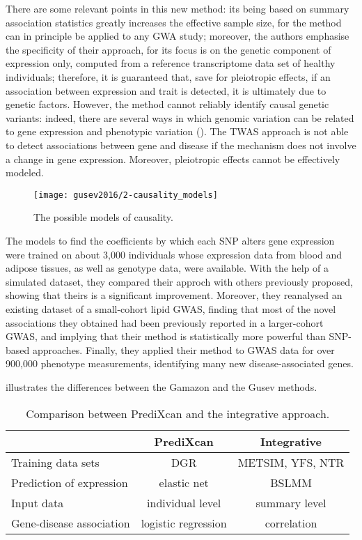 \documentclass[../main.tex]{subfiles}
\begin{document}
There are some relevant points in this new method: its being based on 
summary association statistics greatly increases the effective sample 
size, for the method can in principle be applied to any GWA study; 
moreover, the authors emphasise the specificity of their approach, for 
its focus is on the genetic component of expression only, computed from 
a reference transcriptome data set of healthy individuals; therefore, it 
is guaranteed that, save for pleiotropic effects, if an association 
between expression and trait is detected, it is ultimately due to 
genetic factors. However, the method cannot reliably identify causal 
genetic variants: indeed, there are several ways in which genomic 
variation can be related to gene expression and phenotypic variation 
(). The TWAS approach is not able to detect 
associations between gene and disease if the mechanism does not involve 
a change in gene expression. Moreover, pleiotropic effects cannot be 
effectively modeled.

\begin{figure}
	\texttt{[image: gusev2016/2-causality\_models]}
	\caption{The possible models of causality.}
\end{figure}

The models to find the coefficients by which each SNP alters gene 
expression were trained on about 3,000 individuals whose expression data 
from blood and adipose tissues, as well as genotype data, were 
available. With the help of a simulated dataset, they compared their 
approch with others previously proposed, showing that theirs is a 
significant improvement. Moreover, they reanalysed an existing dataset 
of a small-cohort lipid GWAS, finding that most of the novel 
associations they obtained had been previously reported in a 
larger-cohort GWAS, and implying that their method is statistically more 
powerful than SNP-based approaches. Finally, they applied their method 
to GWAS data for over 900,000 phenotype measurements, identifying many 
new disease-associated genes.

 illustrates the differences between the Gamazon and 
the Gusev methods.

\begin{table}
	\begin{tabular}{ l c c }
		\toprule
		& PrediXcan & Integrative \\
		\midrule
		Training data sets & DGR & METSIM, YFS, NTR \\
		Prediction of expression & elastic net & BSLMM \\
		Input data & individual level & summary level \\
		Gene-disease association & logistic regression & correlation \\
		\bottomrule
	\end{tabular}
	\caption{Comparison between PrediXcan and the integrative approach.}
\end{table}
\end{document}
